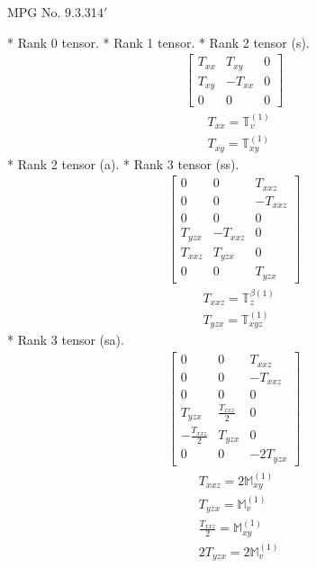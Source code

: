 \documentclass[fleqn,8pt,landscape]{jsarticle}
\begin{document}
\setcounter{MaxMatrixCols}{32}

\renewcommand{\tablename}{Table~}
\renewcommand{\figurename}{Figure~}
\begin{center}
\LARGE
MPG No. 9.3.31\quad$4'$
\end{center}
* Rank 0 tensor.
* Rank 1 tensor.
* Rank 2 tensor (s).
\begin{align*}
\begin{bmatrix} T_{xx} & T_{xy} & 0 \\ T_{xy} & - T_{xx} & 0 \\ 0 & 0 & 0 \end{bmatrix}
\end{align*}
\begin{align*}
& T_{xx} = \mathbb{T}_{v}^{(1)} \\
& T_{xy} = \mathbb{T}_{xy}^{(1)}
\end{align*}
* Rank 2 tensor (a).
* Rank 3 tensor (ss).
\begin{align*}
\begin{bmatrix} 0 & 0 & T_{xxz} \\ 0 & 0 & - T_{xxz} \\ 0 & 0 & 0 \\ T_{yzx} & - T_{xxz} & 0 \\ T_{xxz} & T_{yzx} & 0 \\ 0 & 0 & T_{yzx} \end{bmatrix}
\end{align*}
\begin{align*}
& T_{xxz} = \mathbb{T}_{z}^{\beta(1)} \\
& T_{yzx} = \mathbb{T}_{xyz}^{(1)}
\end{align*}
* Rank 3 tensor (sa).
\begin{align*}
\begin{bmatrix} 0 & 0 & T_{xxz} \\ 0 & 0 & - T_{xxz} \\ 0 & 0 & 0 \\ T_{yzx} & \frac{T_{xxz}}{2} & 0 \\ - \frac{T_{xxz}}{2} & T_{yzx} & 0 \\ 0 & 0 & - 2 T_{yzx} \end{bmatrix}
\end{align*}
\begin{align*}
& T_{xxz} = 2 \mathbb{M}_{xy}^{(1)} \\
& T_{yzx} = \mathbb{M}_{v}^{(1)} \\
& \frac{T_{xxz}}{2} = \mathbb{M}_{xy}^{(1)} \\
& 2 T_{yzx} = 2 \mathbb{M}_{v}^{(1)}
\end{align*}
\end{document}
